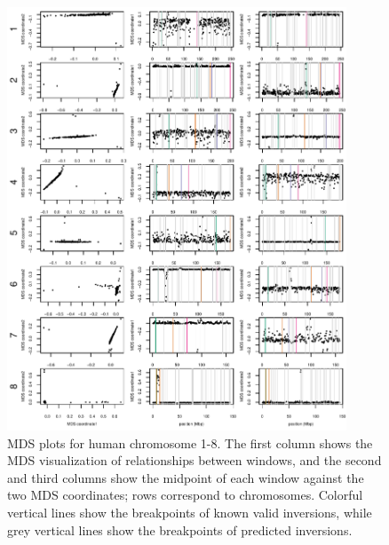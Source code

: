 \documentclass[11pt, oneside]{article}   	%
\begin{document}
\begin{figure}
    \begin{center}
       \includegraphics[width=0.9\textwidth]{FigS_human_MDS12_chr1_8_all_valid_and_pre}
    \end{center}
    \caption{
         MDS plots for human chromosome 1-8.
         The first column shows the MDS visualization of relationships between windows, 
         and the second and third columns show the midpoint of each window against the two MDS coordinates; 
         rows correspond to chromosomes.        
         Colorful vertical lines show the breakpoints of known valid inversions, 
         while grey vertical lines show the breakpoints of predicted inversions.
        \label{sfig:mds12_chr1_8_human}
    }
\end{figure}
\end{document}
